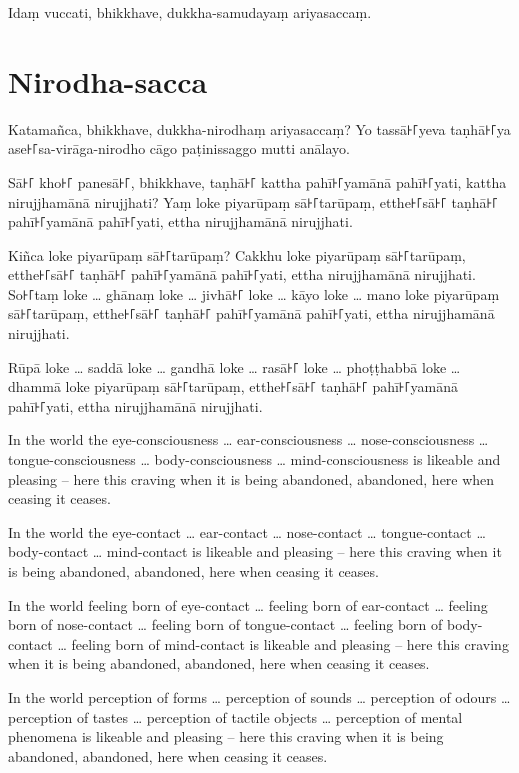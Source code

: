 Idaṃ vuccati, bhikkhave, dukkha-samudayaṃ ariyasaccaṃ.

\section*{Nirodha-sacca}

Katamañca, bhikkhave, dukkha-nirodhaṃ ariyasaccaṃ? Yo tassā꜔꜒yeva taṇhā꜔꜒ya
ase꜔꜒sa-virāga-nirodho cāgo paṭinissaggo mutti anālayo.

Sā꜔꜒ kho꜔꜒ panesā꜔꜒, bhikkhave, taṇhā꜔꜒ kattha pahī꜔꜒yamānā pahī꜔꜒yati, kattha nirujjhamānā
nirujjhati? Yaṃ loke piyarūpaṃ sā꜔꜒tarūpaṃ, etthe꜔꜒sā꜔꜒ taṇhā꜔꜒ pahī꜔꜒yamānā pahī꜔꜒yati,
ettha nirujjhamānā nirujjhati.

Kiñca loke piyarūpaṃ sā꜔꜒tarūpaṃ? Cakkhu loke piyarūpaṃ sā꜔꜒tarūpaṃ, etthe꜔꜒sā꜔꜒ taṇhā꜔꜒
pahī꜔꜒yamānā pahī꜔꜒yati, ettha nirujjhamānā nirujjhati. So꜔꜒taṃ loke \ldots{}
ghānaṃ loke \ldots{} jivhā꜔꜒ loke \ldots{} kāyo loke \ldots{} mano loke
piyarūpaṃ sā꜔꜒tarūpaṃ, etthe꜔꜒sā꜔꜒ taṇhā꜔꜒ pahī꜔꜒yamānā pahī꜔꜒yati, ettha nirujjhamānā
nirujjhati.

Rūpā loke \ldots{} saddā loke \ldots{} gandhā loke \ldots{} rasā꜔꜒ loke \ldots{}
phoṭṭhabbā loke \ldots{} dhammā loke piyarūpaṃ sā꜔꜒tarūpaṃ, etthe꜔꜒sā꜔꜒ taṇhā꜔꜒
pahī꜔꜒yamānā pahī꜔꜒yati, ettha nirujjhamānā nirujjhati.

\englishPage

In the world the eye-consciousness \ldots{} ear-consciousness \ldots{}
nose-consciousness \ldots{} tongue-consciousness \ldots{} body-consciousness
\ldots{} mind-consciousness is likeable and pleasing -- here this craving when
it is being abandoned, abandoned, here when ceasing it ceases.

In the world the eye-contact \ldots{} ear-contact \ldots{} nose-contact \ldots{}
tongue-contact \ldots{} body-contact \ldots{} mind-contact is likeable and
pleasing -- here this craving when it is being abandoned, abandoned, here when
ceasing it ceases.

In the world feeling born of eye-contact \ldots{} feeling born of ear-contact
\ldots{} feeling born of nose-contact \ldots{} feeling born of tongue-contact
\ldots{} feeling born of body-contact \ldots{} feeling born of mind-contact is
likeable and pleasing -- here this craving when it is being abandoned, abandoned,
here when ceasing it ceases.

In the world perception of forms \ldots{} perception of sounds \ldots{}
perception of odours \ldots{} perception of tastes \ldots{} perception of
tactile objects \ldots{} perception of mental phenomena is likeable and pleasing
-- here this craving when it is being abandoned, abandoned, here when ceasing it
ceases.

